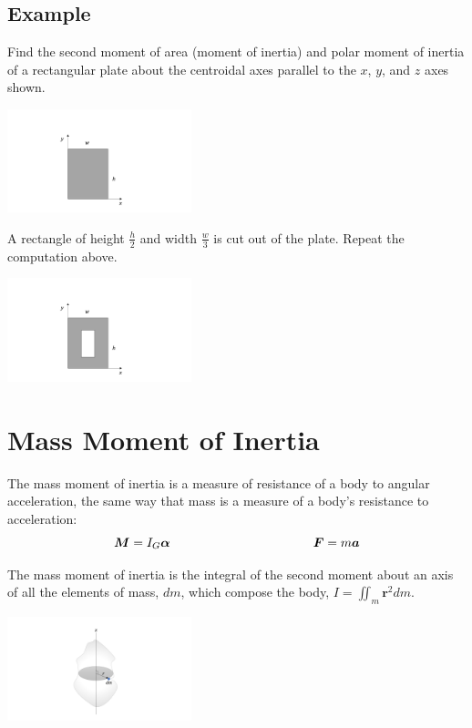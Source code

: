 \documentclass[12pt,letterpaper,twoside]{report}
\begin{document}
\newpage

\subsection{Example}
Find the second moment of area (moment of inertia) and polar moment of inertia of a rectangular plate about the centroidal axes parallel to the $x$, $y$, and $z$ axes shown.  

\includegraphics[trim={8cm 1cm 5cm 4cm},clip,width=0.4\textwidth, left]{Slide40} 

\vspace*{8\baselineskip}

A rectangle of height $\displaystyle \frac{h}{2}$ and width $\displaystyle \frac{w}{3}$ is cut out of the plate. Repeat the computation above.

\includegraphics[trim={8cm 1cm 5cm 4cm},clip,width=0.4\textwidth, left]{Slide43} 

\newpage

\section{Mass Moment of Inertia}
The mass moment of inertia is a measure of resistance of a body to angular acceleration, the same way that mass is a measure of a body’s resistance to acceleration: 
\[ 
\bm{M} = I_G \bm{\alpha} \hspace{4 cm} \bm{F} = m \bm{a}
\]

The mass moment of inertia is the integral of the second moment about an axis of all the elements of mass, $dm$, which compose the body, $\displaystyle I =  \iint_m \bm{r}^2 dm$.

\includegraphics[trim={8cm 1cm 5cm 1.5cm},clip,width=0.4\textwidth, left]{Slide44} 
\end{document}
